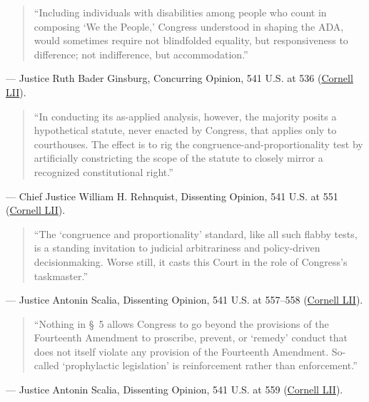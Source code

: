 \documentclass[12pt]{article}
\begin{document}
\begin{quote}
``Including individuals with disabilities among people who count in composing `We the People,' Congress understood in shaping the ADA, would sometimes require not blindfolded equality, but responsiveness to difference; not indifference, but accommodation.''
\end{quote}
\noindent --- Justice Ruth Bader Ginsburg, Concurring Opinion, 541 U.S. at 536 (\href{https://www.law.cornell.edu/supremecourt/text/541/509}{Cornell LII}).

\begin{quote}
``In conducting its as-applied analysis, however, the majority posits a hypothetical statute, never enacted by Congress, that applies only to courthouses. The effect is to rig the congruence-and-proportionality test by artificially constricting the scope of the statute to closely mirror a recognized constitutional right.''
\end{quote}
\noindent --- Chief Justice William H. Rehnquist, Dissenting Opinion, 541 U.S. at 551 (\href{https://www.law.cornell.edu/supremecourt/text/541/509}{Cornell LII}).

\begin{quote}
``The `congruence and proportionality' standard, like all such flabby tests, is a standing invitation to judicial arbitrariness and policy-driven decisionmaking. Worse still, it casts this Court in the role of Congress's taskmaster.''
\end{quote}
\noindent --- Justice Antonin Scalia, Dissenting Opinion, 541 U.S. at 557--558 (\href{https://www.law.cornell.edu/supremecourt/text/541/509}{Cornell LII}).

\begin{quote}
``Nothing in \S~5 allows Congress to go beyond the provisions of the Fourteenth Amendment to proscribe, prevent, or `remedy' conduct that does not itself violate any provision of the Fourteenth Amendment. So-called `prophylactic legislation' is reinforcement rather than enforcement.''
\end{quote}
\noindent --- Justice Antonin Scalia, Dissenting Opinion, 541 U.S. at 559 (\href{https://www.law.cornell.edu/supremecourt/text/541/509}{Cornell LII}).
\end{document}
